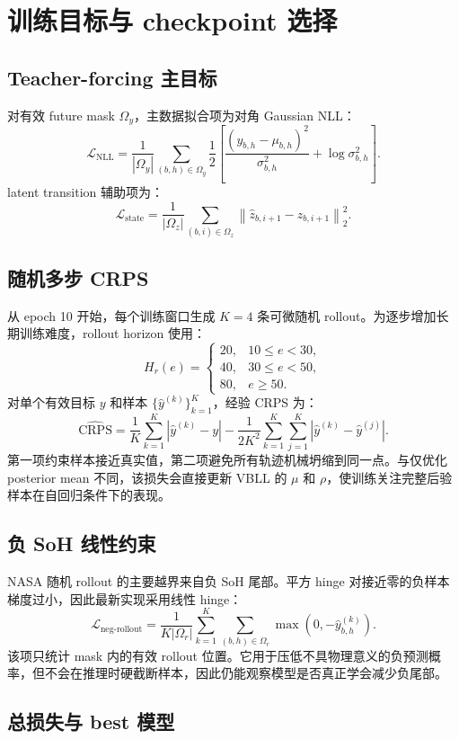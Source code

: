 \documentclass[11pt,a4paper,fontset=none]{ctexart}
\begin{document}
\section{训练目标与 checkpoint 选择}

\subsection{Teacher-forcing 主目标}

对有效 future mask $\Omega_y$，主数据拟合项为对角 Gaussian NLL：
\[
\mathcal L_{\mathrm{NLL}}
=
\frac{1}{|\Omega_y|}
\sum_{(b,h)\in\Omega_y}
\frac12
\left[
\frac{(y_{b,h}-\mu_{b,h})^2}{\sigma_{b,h}^2}
+\log\sigma_{b,h}^2
\right].
\]
latent transition 辅助项为：
\[
\mathcal L_{\mathrm{state}}
=
\frac{1}{|\Omega_z|}
\sum_{(b,i)\in\Omega_z}
\left\|\hat z_{b,i+1}-z_{b,i+1}\right\|_2^2.
\]

\subsection{随机多步 CRPS}

从 epoch 10 开始，每个训练窗口生成 $K=4$ 条可微随机 rollout。为逐步增加长期训练难度，rollout horizon 使用：
\[
H_r(e)=
\begin{cases}
20, & 10\leq e<30,\\
40, & 30\leq e<50,\\
80, & e\geq 50.
\end{cases}
\]
对单个有效目标 $y$ 和样本 $\{\hat y^{(k)}\}_{k=1}^K$，经验 CRPS 为：
\[
\widehat{\mathrm{CRPS}}
=
\frac{1}{K}\sum_{k=1}^K|\hat y^{(k)}-y|
-
\frac{1}{2K^2}
\sum_{k=1}^K\sum_{j=1}^K
|\hat y^{(k)}-\hat y^{(j)}|.
\]
第一项约束样本接近真实值，第二项避免所有轨迹机械坍缩到同一点。与仅优化 posterior mean 不同，该损失会直接更新 VBLL 的 $\mu$ 和 $\rho$，使训练关注完整后验样本在自回归条件下的表现。

\subsection{负 SoH 线性约束}

NASA 随机 rollout 的主要越界来自负 SoH 尾部。平方 hinge 对接近零的负样本梯度过小，因此最新实现采用线性 hinge：
\[
\mathcal L_{\mathrm{neg\mbox{-}rollout}}
=
\frac{1}{K|\Omega_r|}
\sum_{k=1}^K\sum_{(b,h)\in\Omega_r}
\max(0,-\hat y_{b,h}^{(k)}).
\]
该项只统计 mask 内的有效 rollout 位置。它用于压低不具物理意义的负预测概率，但不会在推理时硬截断样本，因此仍能观察模型是否真正学会减少负尾部。

\subsection{总损失与 best 模型}
\end{document}
